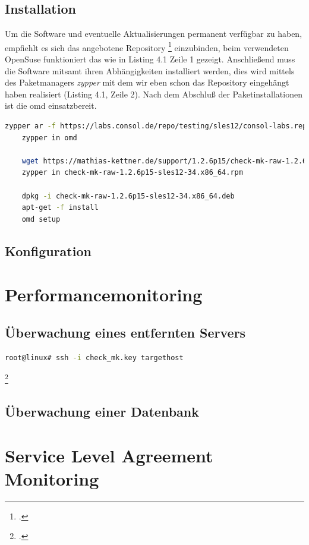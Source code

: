 \documentclass[12pt,a4paper,parskip]{scrreprt}
\begin{document}
	\subsection{Installation}
	Um die Software und eventuelle Aktualisierungen permanent verfügbar zu haben, empfiehlt es sich das angebotene Repository \footcite{omdrepo} einzubinden, beim verwendeten OpenSuse funktioniert das wie in Listing 4.1 Zeile 1 gezeigt. Anschließend muss die Software mitsamt ihren Abhängigkeiten installiert werden, dies wird mittels des Paketmanagers \textit{zypper} mit dem wir eben schon das Repository eingehängt haben realisiert (Listing 4.1, Zeile 2). Nach dem Abschluß der Paketinstallationen ist die \acrshort{omd} einsatzbereit.
	\begin{lstlisting}[language=bash, caption=Konfiguration eines Repositories und Installation der \acrfull{omd}]
	zypper ar -f https://labs.consol.de/repo/testing/sles12/consol-labs.repo
	zypper in omd
	
	wget https://mathias-kettner.de/support/1.2.6p15/check-mk-raw-1.2.6p15-sles12-34.x86_64.rpm
	zypper in check-mk-raw-1.2.6p15-sles12-34.x86_64.rpm
	
	dpkg -i check-mk-raw-1.2.6p15-sles12-34.x86_64.deb
	apt-get -f install
	omd setup
	\end{lstlisting}
	\subsection{Konfiguration}
	
	\section{Performancemonitoring}
	\subsection{Überwachung eines entfernten Servers}
	\begin{lstlisting}[language=bash]
	root@linux# ssh -i check_mk.key targethost
	\end{lstlisting} \footcite{checkmkCheckBySSH2015}
	\subsection{Überwachung einer Datenbank}
	\section{Service Level Agreement Monitoring}
\end{document}
